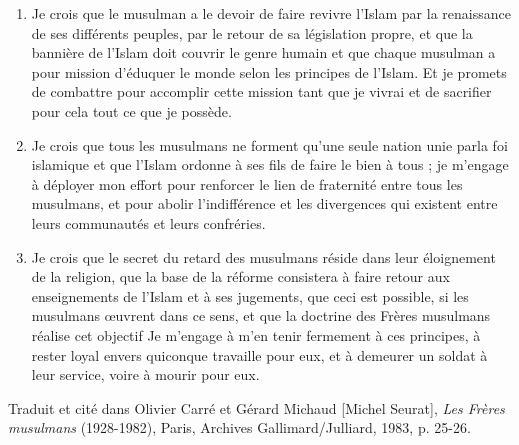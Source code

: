 \begin{enumerate}
\item
  
  Je crois que le musulman a le devoir de faire revivre l'Islam par la
  renaissance de ses différents peuples, par le retour de sa législation
  propre, et que la bannière de l'Islam doit couvrir le genre humain et
  que chaque musulman a pour mission d'éduquer le monde selon les
  principes de l'Islam. Et je promets de combattre pour accomplir cette
  mission tant que je vivrai et de sacrifier pour cela tout ce que je
  possède.
  
\item
  
  Je crois que tous les musulmans ne forment qu'une seule nation unie
  parla foi islamique et que l'Islam ordonne à ses fils de faire le bien
  à tous ; je m'engage à déployer mon effort pour renforcer le lien de
  fraternité entre tous les musulmans, et pour abolir l'indifférence et
  les divergences qui existent entre leurs communautés et leurs
  confréries.
  
\item
  
  Je crois que le secret du retard des musulmans réside dans leur
  éloignement de la religion, que la base de la réforme consistera à
  faire retour aux enseignements de l'Islam et à ses jugements, que ceci
  est possible, si les musulmans œuvrent dans ce sens, et que la
  doctrine des Frères musulmans réalise cet objectif Je m'engage à m'en
  tenir fermement à ces principes, à rester loyal envers quiconque
  travaille pour eux, et à demeurer un soldat à leur service, voire à
  mourir pour eux.
  
\end{enumerate}


Traduit et cité dans Olivier Carré et Gérard Michaud {[}Michel
Seurat{]}, \emph{Les Frères musulmans} (1928-1982), Paris, Archives
Gallimard/Julliard, 1983, p. 25-26.

